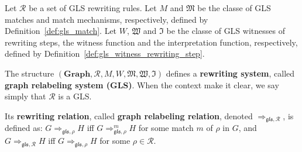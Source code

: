 
\begin{definition}
  Let $\mathcal{R}$ be a set of GLS rewriting rules. Let $M$ and $\mathfrak{M}$ be the classe of GLS matches and match mechanisms, respectively, defined by Definition~\ref{def:gls_match}. Let $W$, $\mathfrak{W}$ and $\mathfrak{I}$
   be the classe of GLS witnesses of rewriting steps, the witness function and the interpretation function, respectively, defined by Definition~\ref{def:gls_witness_rewriting_step}. 

  The structure $(\mathbf{Graph},\mathcal{R},M,W,\mathfrak{M},\mathfrak{W},\mathfrak{I})$ defines a \textbf{rewriting system}, called \textbf{graph relabeling system (GLS)}. When the context make it clear, we say simply that $\mathcal{R}$ is a GLS.

  Its \textbf{rewriting relation}, called \textbf{graph relabeling relation}, denoted $\Rightarrow_{\mathfrak{gls},\mathcal{R}}$, is defined as:  $G  \Rightarrow_{\mathfrak{gls}, \rho} H$ iff $G \Rightarrow^m_{\mathfrak{gls},\rho} H$ for some match $m$ of $\rho$ in $G$, and 
   $G  \Rightarrow_{\mathfrak{gls},\mathcal{R}} H$ iff $G \Rightarrow_{\mathfrak{gls},\rho} H$ for some $\rho \in \mathcal{R}$.
\end{definition}


